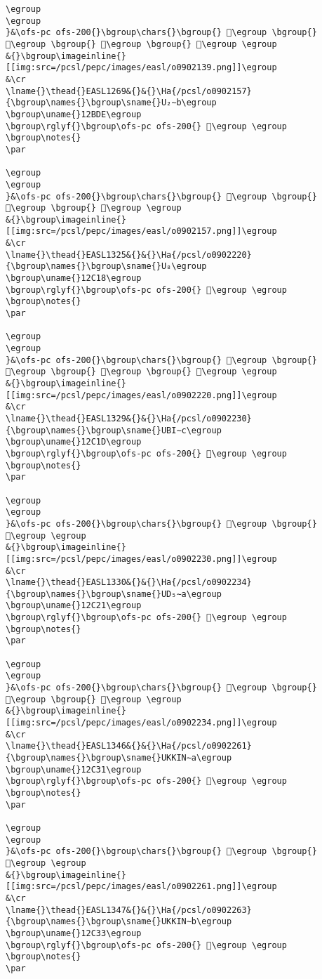 \begin{verbatim}
\egroup
\egroup
}&\ofs-pc ofs-200{}\bgroup\chars{}\bgroup{} 𒯓\egroup \bgroup{} 𒯕\egroup \bgroup{} 𒯖\egroup \bgroup{} 𒯗\egroup \egroup
&{}\bgroup\imageinline{}[[img:src=/pcsl/pepc/images/easl/o0902139.png]]\egroup
&\cr
\lname{}\thead{}EASL1269&{}&{}\Ha{/pcsl/o0902157}{\bgroup\names{}\bgroup\sname{}U₂∼b\egroup
\bgroup\uname{}12BDE\egroup
\bgroup\rglyf{}\bgroup\ofs-pc ofs-200{} 𒯞\egroup \egroup
\bgroup\notes{}
\par 

\egroup
\egroup
}&\ofs-pc ofs-200{}\bgroup\chars{}\bgroup{} 𒯝\egroup \bgroup{} 𒯞\egroup \bgroup{} 𒯟\egroup \egroup
&{}\bgroup\imageinline{}[[img:src=/pcsl/pepc/images/easl/o0902157.png]]\egroup
&\cr
\lname{}\thead{}EASL1325&{}&{}\Ha{/pcsl/o0902220}{\bgroup\names{}\bgroup\sname{}U₈\egroup
\bgroup\uname{}12C18\egroup
\bgroup\rglyf{}\bgroup\ofs-pc ofs-200{} 𒰘\egroup \egroup
\bgroup\notes{}
\par 

\egroup
\egroup
}&\ofs-pc ofs-200{}\bgroup\chars{}\bgroup{} 𒰖\egroup \bgroup{} 𒰘\egroup \bgroup{} 𒰙\egroup \bgroup{} 𒰚\egroup \egroup
&{}\bgroup\imageinline{}[[img:src=/pcsl/pepc/images/easl/o0902220.png]]\egroup
&\cr
\lname{}\thead{}EASL1329&{}&{}\Ha{/pcsl/o0902230}{\bgroup\names{}\bgroup\sname{}UBI∼c\egroup
\bgroup\uname{}12C1D\egroup
\bgroup\rglyf{}\bgroup\ofs-pc ofs-200{} 𒰝\egroup \egroup
\bgroup\notes{}
\par 

\egroup
\egroup
}&\ofs-pc ofs-200{}\bgroup\chars{}\bgroup{} 𒰝\egroup \bgroup{} 𒰞\egroup \egroup
&{}\bgroup\imageinline{}[[img:src=/pcsl/pepc/images/easl/o0902230.png]]\egroup
&\cr
\lname{}\thead{}EASL1330&{}&{}\Ha{/pcsl/o0902234}{\bgroup\names{}\bgroup\sname{}UD₅∼a\egroup
\bgroup\uname{}12C21\egroup
\bgroup\rglyf{}\bgroup\ofs-pc ofs-200{} 𒰡\egroup \egroup
\bgroup\notes{}
\par 

\egroup
\egroup
}&\ofs-pc ofs-200{}\bgroup\chars{}\bgroup{} 𒰟\egroup \bgroup{} 𒰡\egroup \bgroup{} 𒰢\egroup \egroup
&{}\bgroup\imageinline{}[[img:src=/pcsl/pepc/images/easl/o0902234.png]]\egroup
&\cr
\lname{}\thead{}EASL1346&{}&{}\Ha{/pcsl/o0902261}{\bgroup\names{}\bgroup\sname{}UKKIN∼a\egroup
\bgroup\uname{}12C31\egroup
\bgroup\rglyf{}\bgroup\ofs-pc ofs-200{} 𒰱\egroup \egroup
\bgroup\notes{}
\par 

\egroup
\egroup
}&\ofs-pc ofs-200{}\bgroup\chars{}\bgroup{} 𒰲\egroup \bgroup{} 𒰱\egroup \egroup
&{}\bgroup\imageinline{}[[img:src=/pcsl/pepc/images/easl/o0902261.png]]\egroup
&\cr
\lname{}\thead{}EASL1347&{}&{}\Ha{/pcsl/o0902263}{\bgroup\names{}\bgroup\sname{}UKKIN∼b\egroup
\bgroup\uname{}12C33\egroup
\bgroup\rglyf{}\bgroup\ofs-pc ofs-200{} 𒰳\egroup \egroup
\bgroup\notes{}
\par 


\end{verbatim}
